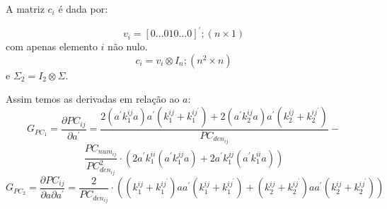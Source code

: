 \documentclass[a4paper,10pt]{article}
\begin{document}
A matriz $c_i$ é dada por:

\begin{equation}
v_{i} = [0 \dots 0 1 0 \dots 0]^{'}; (n \times 1)
\end{equation}
com apenas elemento $i$ não nulo.
\begin{equation}
c_{i} = v_{i} \otimes I_{n}; (n^{2} \times n)
\end{equation}
e $\Sigma_{2} = I_{2} \otimes \Sigma$.

Assim temos as derivadas em relação ao $a$:
\begin{equation}
G_{PC_1} = \frac{\partial PC_{ij}}{\partial a^{'}} = \frac{2 (a^{'} k_{1}^{ij} a) a^{'} (k_{1}^{ij} + k_{1}^{ij^{'}}) + 2 (a^{'} k_{2}^{ij} a) a^{'} (k_{2}^{ij} + k_{2}^{ij^{'}}) } 
{PC_{den_{ij}}} -
\end{equation}
\begin{equation}
\frac{PC_{num_{ij}}}{PC_{den_{ij}}^{2}} \cdot (2 a^{'} k_{1}^{ii} (a^{'} k_{1}^{jj} a) + 2 a^{'} k_{1}^{jj} ( a^{'} k_{1}^{ii} a))
\end{equation}
\begin{equation}
G_{PC_2} = \frac{\partial PC_{ij}}{\partial a \partial a^{'}} = \frac{2}{PC_{den_{ij}}} \cdot ((k_{1}^{ij} + k_{1}^{ij^{'}}) a a^{'} (k_{1}^{ij} + k_{1}^{ij^{'}}) + (k_{2}^{ij} + k_{2}^{ij^{'}}) a a^{'} (k_{2}^{ij} + k_{2}^{ij^{'}}))
\end{equation}
\end{document}
